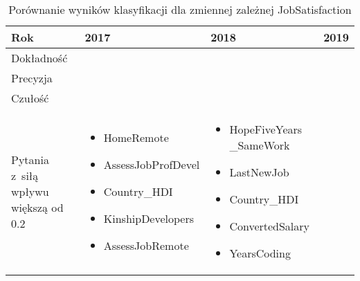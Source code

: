 \noindent\begin{minipage}{\textwidth}
             \begin{table}[H]
                 \raggedright\caption{Porównanie wyników klasyfikacji dla zmiennej zależnej JobSatisfaction\label{tabela:JobSatisfactionClassification}}
                 \begin{center}
                     \begin{tabular}{|P{.1\textwidth}|P{.26\textwidth}|P{.26\textwidth}|P{.26\textwidth}|}

                         \hline
                         Rok        & 2017             & 2018             & 2019             \\
                         \hline
                         Dokładność &  &   &   \\
                         \hline
                         Precyzja   &  &   &   \\
                         \hline
                         Czułość    &  &  &  \\
                         \hline
                         Pytania z~siłą wpływu większą od 0.2 &
                         \begin{itemize}
                             \item HomeRemote
                             \item AssessJobProfDevel
                             \item Country\_HDI
                             \item KinshipDevelopers
                             \item AssessJobRemote
                         \end{itemize} &
                         \begin{itemize}
                             \item HopeFiveYears \_SameWork
                             \item LastNewJob
                             \item Country\_HDI
                             \item ConvertedSalary
                             \item YearsCoding
                         \end{itemize} &
                         \begin{itemize}

\end{itemize}
\end{tabular}
\end{center}
\end{table}
\end{minipage}
